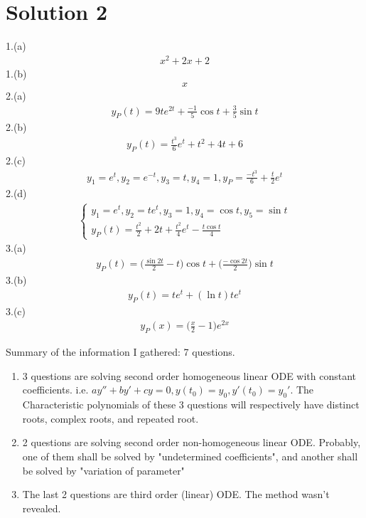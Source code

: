 \documentclass{report}
\begin{document}
\section{Solution 2}
\begin{mdframed}
1.(a)
\begin{align*}
x^2+2x+2
\end{align*}
1.(b)
\begin{align*}
x
\end{align*}
2.(a)
\begin{align*}
y_P(t)=9te^{2t}+ \frac{-1}{5}\cos t+ \frac{3}{5}\sin t
\end{align*}
2.(b)
\begin{align*}
y_P(t)= \frac{t^3}{6}e^t+t^2+4t+6
\end{align*}
2.(c)
\begin{align*}
y_1=e^t,y_2=e^{-t},y_3=t,y_4=1,y_P=\frac{-t^3}{6}+\frac{t}{2}e^t
\end{align*}
2.(d)
\begin{align*}
\begin{cases}
  y_1=e^t,y_2=te^t, y_3=1,y_4=\cos t, y_5= \sin t\\
  y_P(t)=\frac{t^2}{2}+2t+\frac{t^2}{4}e^t- \frac{t \cos t }{4}
\end{cases}
\end{align*}
3.(a)
\begin{align*}
y_P(t)=\Big(\frac{\sin 2t}{2}-t \Big)\cos t+ \Big(\frac{-\cos 2t}{2} \Big)\sin t
\end{align*}
3.(b)
\begin{align*}
y_P(t)=te^t+(\ln t)te^t
\end{align*}
3.(c)
\begin{align*}
  y_P(x)=\Big(\frac{x}{2}-1 \Big)e^{2x}
\end{align*}
\end{mdframed}
\begin{mdframed}
Summary of the information I gathered: 7 questions. 
\begin{enumerate}[label=(\alph*)]
  \item 3 questions are solving second order homogeneous linear ODE with constant coefficients. i.e. $ay''+by'+cy=0, y(t_0)=y_0, y'(t_0)=y_0'$. The Characteristic polynomials of these 3 questions will respectively have distinct roots, complex roots, and repeated root.
  \item 2 questions are solving second order non-homogeneous linear ODE. Probably, one of them shall be solved by "undetermined coefficients", and another shall be solved by "variation of parameter" 
  \item The last 2 questions are third order (linear) ODE. The method wasn't revealed. 
\end{enumerate}

\end{mdframed}
\end{document}
